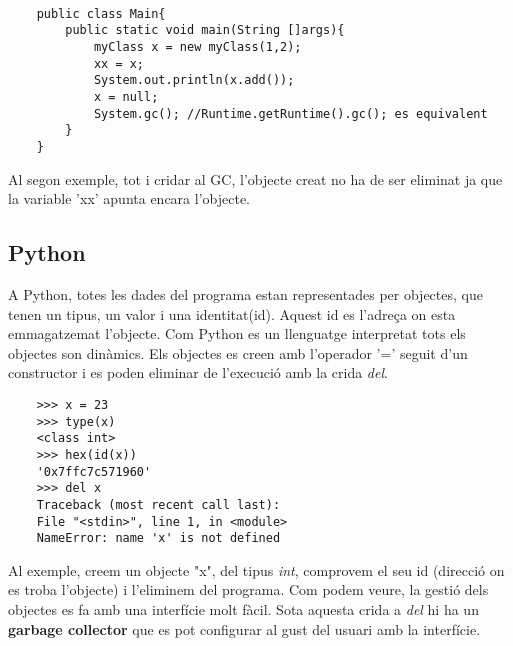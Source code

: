 \begin{verbatim}
    
    public class Main{
        public static void main(String []args){
            myClass x = new myClass(1,2);
            xx = x;
            System.out.println(x.add());
            x = null;  
            System.gc(); //Runtime.getRuntime().gc(); es equivalent
        }
    }
\end{verbatim}  
Al segon exemple, tot i cridar al GC, l'objecte creat no ha de ser eliminat ja que la variable 'xx' apunta encara l'objecte.

\subsection{Python}
A Python, totes les dades del programa estan representades per objectes, que tenen un tipus, un valor i una identitat(id). Aquest id es l'adreça on esta emmagatzemat l'objecte. Com Python es un llenguatge interpretat tots els objectes son dinàmics. Els objectes es creen amb l'operador '=' seguit d'un constructor i es poden eliminar de l'execució amb la crida \textit{del}.

\begin{verbatim}
	>>> x = 23
	>>> type(x)
	<class int>
	>>> hex(id(x))
	'0x7ffc7c571960'
	>>> del x
	Traceback (most recent call last):
	File "<stdin>", line 1, in <module>
	NameError: name 'x' is not defined
\end{verbatim} 
\begin{minipage}{\textwidth}    %
Al exemple, creem un objecte "x", del tipus \textit{int}, comprovem el seu id (direcció on es troba l'objecte) i l'eliminem del programa. Com podem veure, la gestió dels objectes es fa amb una interfície molt fàcil. Sota aquesta crida a \textit{del} hi ha un \textbf{garbage collector} que es pot configurar al gust del usuari amb la interfície\cite{pythonGC}.
\end{minipage}

